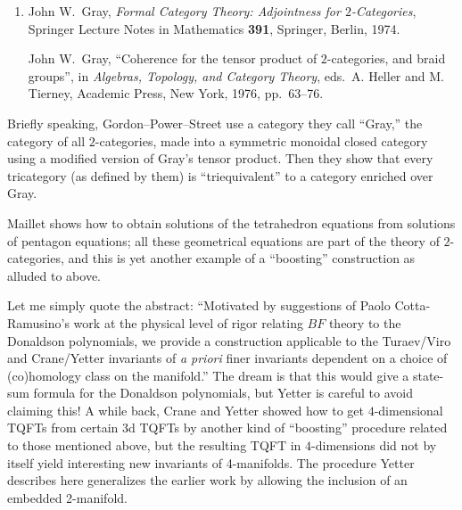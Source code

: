 \documentclass{article}
\def\tightlist{}
\renewcommand{\texttt}[1]{%
  \begingroup
  \ttfamily
  \begingroup\lccode`~=`/\lowercase{\endgroup\def~}{/\discretionary{}{}{}}%
  \begingroup\lccode`~=`[\lowercase{\endgroup\def~}{[\discretionary{}{}{}}%
  \begingroup\lccode`~=`.\lowercase{\endgroup\def~}{.\discretionary{}{}{}}%
  \catcode`/=\active\catcode`[=\active\catcode`.=\active
  \scantokens{#1\noexpand}%
  \endgroup
}
\begin{document}
\begin{enumerate}
\def\labelenumi{\arabic{enumi})}
\setcounter{enumi}{2}
\item
   John W.\ Gray, \emph{Formal Category Theory: Adjointness for \(2\)-Categories}, 
  Springer Lecture Notes in Mathematics \textbf{391},
  Springer, Berlin, 1974.

    John W.\ Gray, ``Coherence for the tensor product of \(2\)-categories, and braid
  groups'', in \emph{Algebras, Topology, and Category Theory}, eds.~A.
  Heller and M. Tierney, Academic Press, New York, 1976, pp.~63--76.
\end{enumerate}

Briefly speaking, Gordon--Power--Street use a category they call ``Gray,''
the category of all \(2\)-categories, made into a symmetric monoidal
closed category using a modified version of Gray's tensor product. Then
they show that every tricategory (as defined by them) is
``triequivalent'' to a category enriched over Gray.


Maillet shows how to obtain solutions of the tetrahedron equations from
solutions of pentagon equations; all these geometrical equations are
part of the theory of \(2\)-categories, and this is yet another example
of a ``boosting'' construction as alluded to above.


Let me simply quote the abstract: ``Motivated by suggestions of Paolo
Cotta-Ramusino's work at the physical level of rigor relating \(BF\)
theory to the Donaldson polynomials, we provide a construction
applicable to the Turaev/Viro and Crane/Yetter invariants of \emph{a
priori} finer invariants dependent on a choice of (co)homology class on
the manifold.'' The dream is that this would give a state-sum formula
for the Donaldson polynomials, but Yetter is careful to avoid claiming
this! A while back, Crane and Yetter showed how to get \(4\)-dimensional
TQFTs from certain 3d TQFTs by another kind of ``boosting'' procedure
related to those mentioned above, but the resulting TQFT in
\(4\)-dimensions did not by itself yield interesting new invariants of
4-manifolds. The procedure Yetter describes here generalizes the earlier
work by allowing the inclusion of an embedded 2-manifold.
\end{document}
